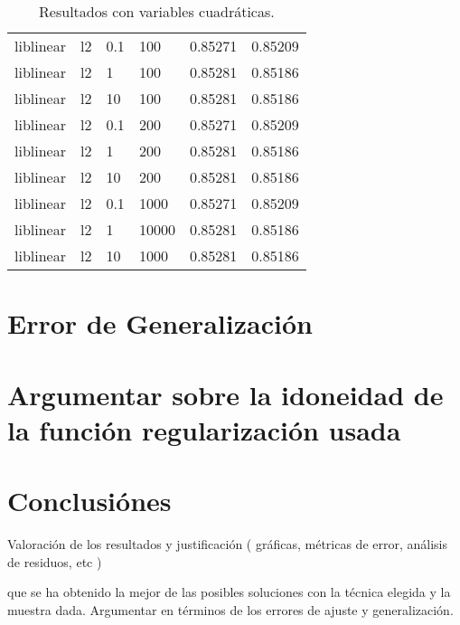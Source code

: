 \documentclass[11pt,a4paper]{article}
\begin{document}
\begin{table}[h]
\begin{center}
\begin{tabular}{|l|l|l|l|l|l|}
liblinear & l2 & 0.1 & 100 & 0.85271 & 0.85209\\

liblinear & l2 & 1  &100  & 0.85281 & 0.85186\\

liblinear & l2 & 10 & 100 & 0.85281 & 0.85186\\

liblinear & l2 & 0.1 & 200 & 0.85271 & 0.85209\\

liblinear & l2 & 1 & 200 & 0.85281 & 0.85186\\

liblinear & l2 & 10  &200  & 0.85281 & 0.85186\\

liblinear & l2 & 0.1 & 1000 & 0.85271 & 0.85209\\

liblinear & l2 & 1 & 10000  & 0.85281 & 0.85186\\

liblinear & l2 & 10 & 1000 & 0.85281 & 0.85186\\

\end{tabular}
\end{center}
\caption{Resultados con variables cuadráticas.}
	\end{table}

 

\section{ Error de Generalización}
\section{ Argumentar sobre la idoneidad de la función regularización usada }
\section{ Conclusiónes }
Valoración de los resultados y justificación
( gráficas, métricas de error, análisis de residuos, etc )


que se ha obtenido la mejor de las posibles soluciones con la técnica elegida y la muestra dada. Argumentar en términos de los errores de ajuste y generalización. 
\end{document}
